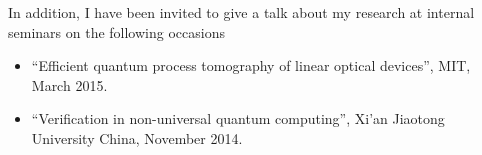 In addition, I have been invited to give a talk about my research at internal
seminars on the following occasions
\begin{itemize}
  \item ``Efficient quantum process tomography of linear optical devices'',
    MIT, March 2015.
  \item ``Verification in non-universal quantum computing'', Xi'an Jiaotong
    University China, November 2014.
\end{itemize}
